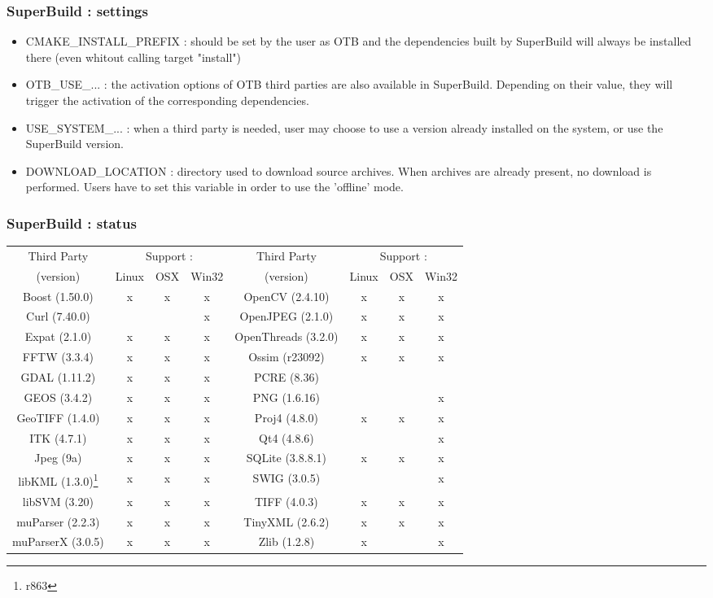 \documentclass[8pt]{beamer}
\begin{document}
\begin{frame}
\frametitle{SuperBuild : settings}

\begin{itemize}
\item CMAKE\_INSTALL\_PREFIX : should be set by the user as OTB and the dependencies built by SuperBuild will always be installed there (even whitout calling target "install")  
\item OTB\_USE\_... : the activation options of OTB third parties are also available in SuperBuild. Depending on their value, they will trigger the activation of the corresponding dependencies.
\item USE\_SYSTEM\_... : when a third party is needed, user may choose to use a version already installed on the system, or use the SuperBuild version.
\item DOWNLOAD\_LOCATION : directory used to download source archives. When archives are already present, no download is performed. Users have to set this variable in order to use the 'offline' mode.
\end{itemize}

\end{frame}

\begin{frame}
\frametitle{SuperBuild : status}

\begin{center}
\begin{tabular}{|c|@{}c@{}|@{}c@{}|@{}c@{}||c|@{}c@{}|@{}c@{}|@{}c@{}|}
\hline
Third Party  & \multicolumn{3}{c||}{Support :} & Third Party  & \multicolumn{3}{c|}{Support :}\\
(version) & Linux & OSX & Win32 & (version) & Linux & OSX & Win32 \\
\hline
Boost (1.50.0) & x & x & x & OpenCV (2.4.10) & x & x & x\\
\hline
Curl (7.40.0) & & & x & OpenJPEG (2.1.0) & x & x & x\\
\hline
Expat (2.1.0) & x & x & x & OpenThreads (3.2.0) & x & x & x\\
\hline
FFTW (3.3.4) & x & x & x & Ossim (r23092) & x & x & x\\
\hline
GDAL (1.11.2) & x & x & x & PCRE (8.36) & & &\\
\hline
GEOS (3.4.2) & x & x & x & PNG (1.6.16) &  &  & x\\
\hline
GeoTIFF (1.4.0) & x & x & x & Proj4 (4.8.0) & x & x & x\\
\hline
ITK (4.7.1) & x & x & x & Qt4 (4.8.6) & & & x\\
\hline
Jpeg (9a) & x & x & x & SQLite (3.8.8.1) & x & x & x\\
\hline
libKML (1.3.0)\footnote{r863} & x & x & x & SWIG (3.0.5) & & & x\\
\hline
libSVM (3.20) & x & x & x & TIFF (4.0.3) & x & x & x\\
\hline
muParser (2.2.3) & x & x & x & TinyXML (2.6.2) & x & x & x\\
\hline
muParserX (3.0.5) & x & x & x & Zlib (1.2.8) & x & & x\\
\hline

\end{tabular}
\end{center}


\end{frame}
\end{document}
